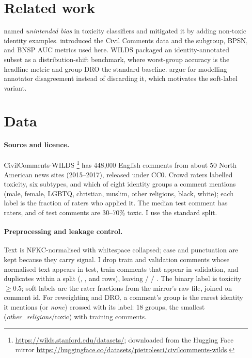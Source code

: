 \documentclass[11pt]{article}
\begin{document}
\section{Related work}
\citet{dixon2018measuring} named \emph{unintended bias} in toxicity classifiers and mitigated it by adding non-toxic
identity examples. \citet{borkan2019nuanced} introduced the Civil Comments data and the subgroup, BPSN, and BNSP AUC
metrics used here. WILDS \citep{koh2021wilds} packaged an identity-annotated subset as a distribution-shift benchmark,
where worst-group accuracy is the headline metric and group DRO \citep{sagawa2020distributionally} the standard
baseline. \citet{davani2022dealing} argue for modelling annotator disagreement instead of discarding it, which
motivates the soft-label variant.

\section{Data}
\label{sec:data}
\paragraph{Source and licence.} CivilComments-WILDS \citep{koh2021wilds}\footnote{\url{https://wilds.stanford.edu/datasets/};
downloaded from the Hugging Face mirror \url{https://huggingface.co/datasets/pietrolesci/civilcomments-wilds}.} has
448{,}000 English comments from about 50 North American news sites (2015--2017), released under CC0. Crowd raters
labelled toxicity, six subtypes, and which of eight identity groups a comment mentions (male, female, LGBTQ,
christian, muslim, other religions, black, white); each label is the fraction of raters who applied it. The median
test comment has \MedianRaters{} raters, and \BorderlineShare{} of test comments are 30--70\% toxic. I use the
standard split.

\paragraph{Preprocessing and leakage control.} Text is NFKC-normalised with whitespace collapsed; case and
punctuation are kept because they carry signal. I drop train and validation comments whose normalised text appears in
test, train comments that appear in validation, and duplicates within a split (\LeakTrain{}, \LeakVal{}, and
\LeakTest{} rows), leaving \NTrain{} / \NVal{} / \NTest{}. The binary label is toxicity $\geq 0.5$; soft labels are the
rater fractions from the mirror's raw file, joined on comment id. For reweighting and DRO, a comment's group is the
rarest identity it mentions (or \emph{none}) crossed with its label: 18 groups, the smallest
(\emph{other\_religions}/toxic) with \SmallestGroupN{} training comments.
\end{document}

